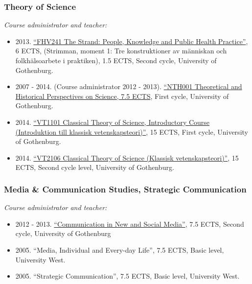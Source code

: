 \documentclass[a4paper,11pt,oneside]{article}
\begin{document}
        \subsubsection{Theory of Science}
        \noindent \emph{Course administrator and teacher:}
        \begin{itemize}
          \item 2013. \href{http://files.christopherkullenberg.se/kursplaner/FHV241Strimman.pdf}{``FHV241 The Strand: People, Knowledge and Public Health Practice''}, 6 ECTS, (Strimman, moment 1: Tre konstruktioner av människan och folkhälsoarbete i praktiken), 1.5 ECTS, Second cycle, University of Gothenburg.
          \item 2007 - 2014. (Course administrator 2012 - 2013). \href{http://files.christopherkullenberg.se/kursplaner/NTH001_Teoretiska_och_historiska_perspektiv_pa%cc%8a_naturvetenskap_10512.pdf}{``NTH001 Theoretical and Historical Perspectives on Science, 7.5 ECTS}, First cycle, University of Gothenburg.
          \item 2014. \href{http://files.christopherkullenberg.se/kursplaner/VT1101_Introduktion_i_klassisk_vetenskapsteori__grundkurs_13185.pdf}{``VT1101 Classical Theory of Science, Introductory Course (Introduktion till klassisk vetenskapsteori)''}, 15 ECTS, First cycle, University of Gothenburg.
          \item 2014. \href{http://files.christopherkullenberg.se/kursplaner/VT2106_Klassisk_vetenskapsteori_13187.pdf}{``VT2106 Classical Theory of Science (Klassisk vetenskapsteori)''}, 15 ECTS, Second cycle level, University of Gothenburg.
        \end{itemize}

        \subsubsection{Media \& Communication Studies, Strategic Communication}
             \noindent \emph{Course administrator and teacher:}
             \begin{itemize}
               \item 2012 - 2013. \href{http://files.christopherkullenberg.se/kursplaner/KT2102.pdf}{``Communication in New and Social Media''}, 7.5 ECTS, Second cycle, University of Gothenburg
               \item 2005. ``Media, Individual and Every-day Life'', 7.5 ECTS, Basic level, University West.
               \item 2005. ``Strategic Communication'', 7.5 ECTS, Basic level, University West.
             \end{itemize}
\end{document}
